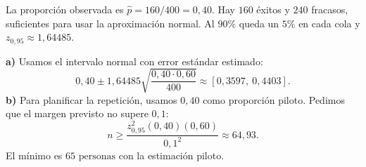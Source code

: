 La proporción observada es $\hat p=160/400=0{,}40$. Hay $160$ éxitos y $240$ fracasos, suficientes para usar la aproximación normal. Al $90\%$ queda un $5\%$ en cada cola y $z_{0{,}95}\approx1{,}64485$.

\textbf{a)} Usamos el intervalo normal con error estándar estimado:
\[
0{,}40\pm 1{,}64485\sqrt{\frac{0{,}40\cdot0{,}60}{400}}
\approx\boxed{[0{,}3597,\ 0{,}4403]}.
\]
\textbf{b)} Para planificar la repetición, usamos $0{,}40$ como proporción piloto. Pedimos que el margen previsto no supere $0{,}1$:
\[
n\ge \frac{z_{0{,}95}^2(0{,}40)(0{,}60)}{0{,}1^2}\approx 64{,}93.
\]
El mínimo es $\boxed{65\text{ personas}}$ con la estimación piloto.
